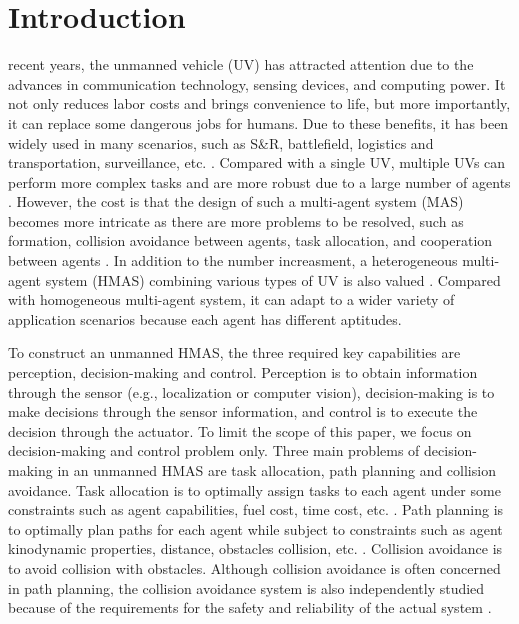 \documentclass{ieeeaccess}
\begin{document}
\section{Introduction}
 recent years, the unmanned vehicle (UV) has attracted attention due to the advances in communication technology, sensing devices, and computing power. It not only reduces labor costs and brings convenience to life, but more importantly, it can replace some dangerous jobs for humans. Due to these benefits, it has been widely used in many scenarios, such as S\&R, battlefield, logistics and transportation, surveillance, etc. \cite{9700861}. Compared with a single UV, multiple UVs can perform more complex tasks and are more robust due to a large number of agents \cite{8352646}. However, the cost is that the design of such a multi-agent system (MAS) becomes more intricate as there are more problems to be resolved, such as formation, collision avoidance between agents, task allocation, and cooperation between agents \cite{chen2019control}. In addition to the number increasment, a heterogeneous multi-agent system (HMAS) combining various types of UV is also valued \cite{9371292}. Compared with homogeneous multi-agent system, it can adapt to a wider variety of application scenarios because each agent has different aptitudes.

To construct an unmanned HMAS, the three required key capabilities are perception, decision-making and control. Perception is to obtain information through the sensor (e.g., localization or computer vision), decision-making is to make decisions through the sensor information, and control is to execute the decision through the actuator. To limit the scope of this paper, we focus on decision-making and control problem only. Three main problems of decision-making in an unmanned HMAS are task allocation, path planning and collision avoidance. Task allocation is to optimally assign tasks to each agent under some constraints such as agent capabilities, fuel cost, time cost, etc. \cite{skaltsis2021survey}. Path planning is to optimally plan paths for each agent while subject to constraints such as agent kinodynamic properties, distance, obstacles collision, etc. \cite{zhang2018path}. Collision avoidance is to avoid collision with obstacles. Although collision avoidance is often concerned in path planning, the collision avoidance system is also independently studied because of the requirements for the safety and reliability of the actual system \cite{9108245}.
\end{document}
